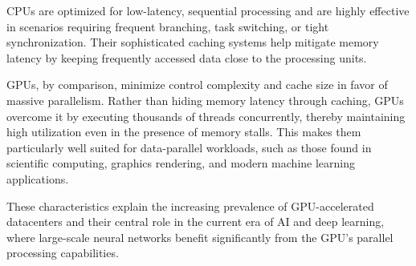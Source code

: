 \documentclass[modern,longauthor]{aastex7}
\begin{document}
CPUs are optimized for low-latency, sequential processing and are highly effective in scenarios requiring frequent branching, task switching, or tight synchronization. Their sophisticated caching systems help mitigate memory latency by keeping frequently accessed data close to the processing units.

GPUs, by comparison, minimize control complexity and cache size in favor of massive parallelism. Rather than hiding memory latency through caching, GPUs overcome it by executing thousands of threads concurrently, thereby maintaining high utilization even in the presence of memory stalls. This makes them particularly well suited for data-parallel workloads, such as those found in scientific computing, graphics rendering, and modern machine learning applications.

These characteristics explain the increasing prevalence of GPU-accelerated datacenters and their central role in the current era of AI and deep learning, where large-scale neural networks benefit significantly from the GPU’s parallel processing capabilities.
\end{document}
